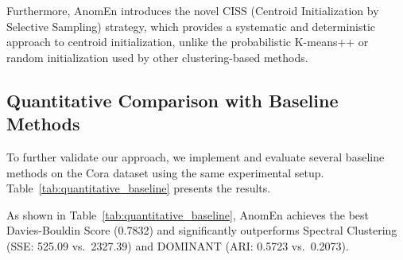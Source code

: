 \documentclass[10pt,twocolumn,a4paper]{article}
\begin{document}
Furthermore, AnomEn introduces the novel CISS (Centroid Initialization by Selective Sampling) strategy, which provides a systematic and deterministic approach to centroid initialization, unlike the probabilistic K-means++ or random initialization used by other clustering-based methods.

\subsection{Quantitative Comparison with Baseline Methods}

To further validate our approach, we implement and evaluate several baseline methods on the Cora dataset using the same experimental setup. Table~\ref{tab:quantitative_baseline} presents the results.

\begin{table}[ht]
\centering
\caption{Quantitative Comparison of AnomEn with Baseline Methods on the Cora Dataset}
\label{tab:quantitative_baseline}
\end{table}

As shown in Table~\ref{tab:quantitative_baseline}, AnomEn achieves the best Davies-Bouldin Score (0.7832) and significantly outperforms Spectral Clustering (SSE: 525.09 vs.\ 2327.39) and DOMINANT (ARI: 0.5723 vs.\ 0.2073).
\end{document}
